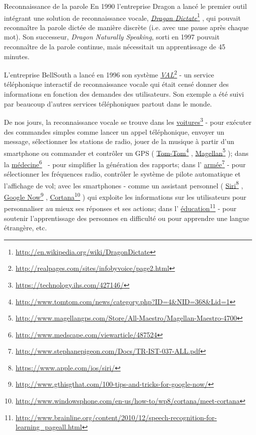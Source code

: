 \documentclass{style/these}
\newcommand\fnurl[2]{%
  \href{#2}{#1}\footnote{\url{#2}}%
}
\begin{document}
\begin{part}{Reconnaissance de la parole}
En 1990 l'entreprise Dragon a lancé le premier outil intégrant une solution de reconnaissance vocale, \fnurl{\textit{Dragon Dictate}}{http://en.wikipedia.org/wiki/DragonDictate}, qui pouvait reconnaître la parole dictée de manière discrète (i.e. avec une pause après chaque mot). Son successeur, \textit{Dragon Naturally Speaking}, sorti en 1997 pouvait reconnaître de la parole continue, mais nécessitait un apprentissage de 45 minutes.

L'entreprise BellSouth a lancé en 1996 son système \fnurl{\textit{VAL}}{http://realpages.com/sites/infobyvoice/page2.html} - un service téléphonique interactif de reconnaissance vocale qui était censé donner des informations en fonction des demandes des utilisateurs. Son exemple a été suivi par beaucoup d'autres services téléphoniques partout dans le monde.  

De nos jours, la reconnaissance vocale se trouve dans les \fnurl{voitures}{https://technology.ihs.com/427146/} - pour exécuter des commandes simples comme lancer un appel téléphonique, envoyer un message, sélectionner les stations de radio, jouer de la musique à partir d'un smartphone ou commander et contrôler un GPS (\fnurl{Tom-Tom}{http://www.tomtom.com/news/category.php?ID=4\&NID=368\&Lid=1}, \fnurl{Magellan}{http://www.magellangps.com/Store/All-Maestro/Magellan-Maestro-4700}); dans la \fnurl{médecine}{http://www.medscape.com/viewarticle/487524}~- pour simplifier la génération des rapports; dans l'\fnurl{armée}{http://www.stephanepigeon.com/Docs/TR-IST-037-ALL.pdf} - pour sélectionner les fréquences radio, contrôler le système de pilote automatique et l'affichage de vol; avec les smartphones - comme un assistant personnel (\fnurl{Siri}{https://www.apple.com/ios/siri/}, \fnurl{Google Now}{http://www.gthisgthat.com/100-tips-and-tricks-for-google-now/}, \fnurl{Cortana}{http://www.windowsphone.com/en-us/how-to/wp8/cortana/meet-cortana}) qui exploite les informations sur les utilisateurs pour personnaliser au mieux ses réponses et ses actions; dans l'\fnurl{éducation}{http://www.brainline.org/content/2010/12/speech-recognition-for-learning_pageall.html} - pour soutenir l'apprentissage des personnes en difficulté ou pour apprendre une langue étrangère, etc.   



\end{part}
\end{document}
